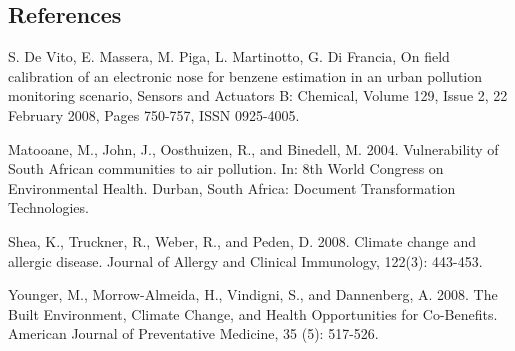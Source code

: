 \documentclass[]{article}
\begin{document}
\hypertarget{references}{%
\subsection{References}\label{references}}

S. De Vito, E. Massera, M. Piga, L. Martinotto, G. Di Francia, On field
calibration of an electronic nose for benzene estimation in an urban
pollution monitoring scenario, Sensors and Actuators B: Chemical, Volume
129, Issue 2, 22 February 2008, Pages 750-757, ISSN 0925-4005.

Matooane, M., John, J., Oosthuizen, R., and Binedell, M. 2004.
Vulnerability of South African communities to air pollution. In: 8th
World Congress on Environmental Health. Durban, South Africa: Document
Transformation Technologies.

Shea, K., Truckner, R., Weber, R., and Peden, D. 2008. Climate change
and allergic disease. Journal of Allergy and Clinical Immunology,
122(3): 443-453.

Younger, M., Morrow-Almeida, H., Vindigni, S., and Dannenberg, A. 2008.
The Built Environment, Climate Change, and Health Opportunities for
Co-Benefits. American Journal of Preventative Medicine, 35 (5): 517-526.
\end{document}
